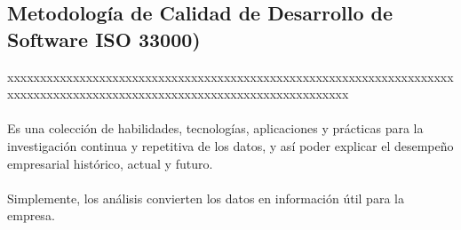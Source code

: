 \documentclass[preprint,12pt]{elsarticle}
\begin{document}
	\subsection{\textbf{Metodología de Calidad de Desarrollo de Software ISO 33000) }}
	xxxxxxxxxxxxxxxxxxxxxxxxxxxxxxxxxxxxxxxxxxxxxxxxxxxxxxxxxxxxxxxxxxxxxxxxxxxxxxxxxxxxxxxxxxxxxxxxxxxxxxxxxxxxxxxxxxxxxxxx \\\\
Es una colección de habilidades, tecnologías, aplicaciones y prácticas para la investigación continua y repetitiva de los datos, y así poder explicar el desempeño empresarial histórico, actual y futuro. \\
\\Simplemente, los análisis convierten los datos en información útil para la empresa.


\end{document}
